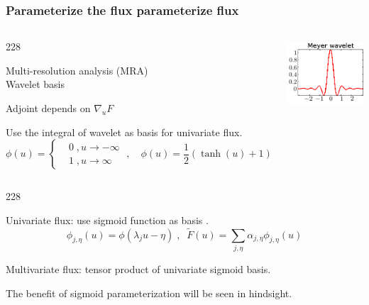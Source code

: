\documentclass{beamer}
\let\oldcite=\cite
\renewcommand{\cite}[1]{\textcolor[rgb]{.4,.4,.85}{\oldcite{#1}}}
\newcommand{\barrow}{\item[\color{darkred}\ding{228}]}
\begin{document}
\begin{frame}
    \frametitle{Parameterize the flux \hfill \scriptsize{parameterize flux}}\small
    \begin{columns}
    \begin{dinglist}{228}
        \barrow Multi-resolution analysis (MRA) \scriptsize{\cite{Mallat 89}}\small\\
                Wavelet basis
        \barrow Adjoint depends on $\nabla_u F$
        \barrow Use the integral of wavelet as basis for univariate flux.
                \begin{equation*}
                    \phi(u) = \left\{
                    \begin{split}
                        &0\;, u\rightarrow -\infty\\
                        &1\;, u\rightarrow \infty
                    \end{split}
                    \right.\;,
                 \quad
                 \phi(u) = \frac{1}{2}\left(\tanh (u) + 1\right) 
                \end{equation*}
   \end{dinglist}
   \includegraphics[height=2.5cm]{meyer_2.png}
   \end{columns}
   
   \begin{dinglist}{228}
        \barrow Univariate flux: use sigmoid function as basis \scriptsize\cite{Mhaskar 92} \small.
             $$
                 \phi_{j,\eta}(u) = \phi(\lambda_j u-\eta)\;,\;\;
                 \tilde{F}(u) = \sum_{j,\eta} \alpha_{j,\eta}\phi_{j,\eta}(u)
             $$
        \barrow
             Multivariate flux: 
             tensor product of univariate sigmoid basis.
        \barrow
        The benefit of sigmoid parameterization will be seen in hindsight.
    \end{dinglist}
\end{frame}
\end{document}

